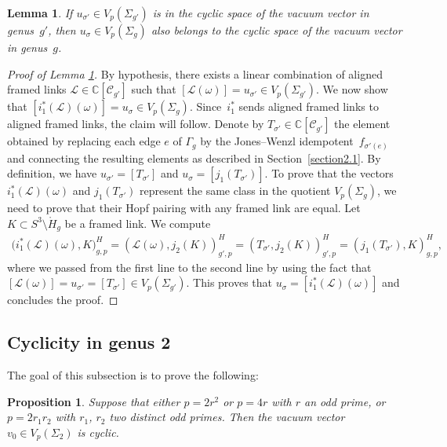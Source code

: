 \documentclass[pdftex]{sigma}
\numberwithin{equation}{section}
\newtheorem{Lemma}[Theorem]{Lemma}
\newtheorem{Proposition}[Theorem]{Proposition}
\begin{document}
\begin{Lemma}\label{lemma_reduction}If $u_{\sigma'}\in V_p(\Sigma_{g'})$ is in the cyclic space of the vacuum vector in genus~$g'$, then $u_{\sigma}\in V_p(\Sigma_g)$ also belongs to the cyclic space of the vacuum vector in genus~$g$.
\end{Lemma}

\begin{proof}[Proof of Lemma \ref{lemma_reduction}]
By hypothesis, there exists a linear combination of aligned framed links $\mathcal{L}\in \mathbb{C}[\mathcal{C}_{g'}]$ such that $[\mathcal{L}(\omega)]= u_{\sigma'} \in V_p(\Sigma_{g'})$. We now show that $[i_1^*(\mathcal{L})(\omega)]=u_{\sigma}\in V_p(\Sigma_g)$. Since~$i_1^*$ sends aligned framed links to aligned framed links, the claim will follow. Denote by \mbox{$T_{\sigma'}\in \mathbb{C}[\mathcal{C}_{g'}]$} the element obtained by replacing each edge $e$ of $\Gamma_g$ by the Jones--Wenzl idempotent~$f_{\sigma'(e)}$ and connecting the resulting elements as described in Section~\ref{section2.1}. By definition, we have $u_{\sigma'}=[T_{\sigma'}]$ and $u_{\sigma}=[j_1 ( T_{\sigma'})]$. To prove that the vectors $i_1^*(\mathcal{L})(\omega)$ and $j_1 ( T_{\sigma'})$ represent the same class in the quotient $V_p(\Sigma_g)$, we need to prove that their Hopf pairing with any framed link are equal. Let $K\subset S^3\setminus \mathring{H}_g$ be a framed link. We compute
\begin{gather*}
\big( i_1^*(\mathcal{L})(\omega), K \big)^H_{g, p} = ( \mathcal{L}(\omega), j_2(K) )^H_{g', p} = ( T_{\sigma'}, j_2(K) )^H_{g',p}= ( j_1(T_{\sigma'}), K )^H_{g,p},
\end{gather*}
where we passed from the first line to the second line by using the fact that $[\mathcal{L}(\omega)]=u_{\sigma'}= [T_{\sigma'}]\in V_p(\Sigma_{g'})$. This proves that $u_{\sigma}=[i_1^*(\mathcal{L})(\omega)]$ and concludes the proof.
\end{proof}

\subsection{Cyclicity in genus 2}
The goal of this subsection is to prove the following:
\begin{Proposition}\label{prop_cyclicity_high_genus}
Suppose that either $p=2r^2$ or $p=4r$ with $r$ an odd prime, or $p=2r_1r_2$ with $r_1$, $r_2$ two distinct odd primes. Then the vacuum vector $v_0\in V_p(\Sigma_2)$ is cyclic.
\end{Proposition}
\end{document}
